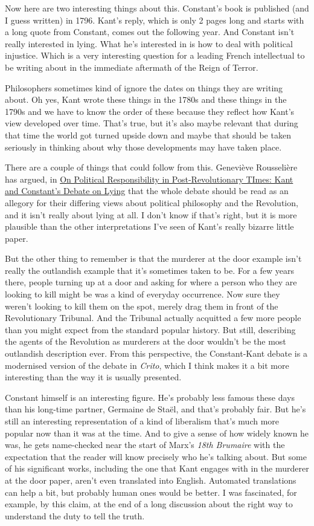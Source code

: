 \documentclass[
]{article}
\begin{document}
Now here are two interesting things about this. Constant's book is
published (and I guess written) in 1796. Kant's reply, which is only 2
pages long and starts with a long quote from Constant, comes out the
following year. And Constant isn't really interested in lying. What he's
interested in is how to deal with political injustice. Which is a very
interesting question for a leading French intellectual to be writing
about in the immediate aftermath of the Reign of Terror.

Philosophers sometimes kind of ignore the dates on things they are
writing about. Oh yes, Kant wrote these things in the 1780s and these
things in the 1790s and we have to know the order of these because they
reflect how Kant's view developed over time. That's true, but it's also
maybe relevant that during that time the world got turned upside down
and maybe that should be taken seriously in thinking about why those
developments may have taken place.

There are a couple of things that could follow from this. Geneviève
Rousselière has argued, in
\href{https://journals.sagepub.com/doi/abs/10.1177/1474885115588100?journalCode=epta}{On
Political Responsibility in Post-Revolutionary TImes: Kant and
Constant's Debate on Lying} that the whole debate should be read as an
allegory for their differing views about political philosophy and the
Revolution, and it isn't really about lying at all. I don't know if
that's right, but it is more plausible than the other interpretations
I've seen of Kant's really bizarre little paper.

But the other thing to remember is that the murderer at the door example
isn't really the outlandish example that it's sometimes taken to be. For
a few years there, people turning up at a door and asking for where a
person who they are looking to kill might be was a kind of everyday
occurrence. Now sure they weren't looking to kill them on the spot,
merely drag them in front of the Revolutionary Tribunal. And the
Tribunal actually acquitted a few more people than you might expect from
the standard popular history. But still, describing the agents of the
Revolution as murderers at the door wouldn't be the most outlandish
description ever. From this perspective, the Constant-Kant debate is a
modernised version of the debate in \emph{Crito}, which I think makes it
a bit more interesting than the way it is usually presented.

Constant himself is an interesting figure. He's probably less famous
these days than his long-time partner, Germaine de Staël, and that's
probably fair. But he's still an interesting representation of a kind of
liberalism that's much more popular now than it was at the time. And to
give a sense of how widely known he was, he gets name-checked near the
start of Marx's \emph{18th Brumaire} with the expectation that the
reader will know precisely who he's talking about. But some of his
significant works, including the one that Kant engages with in the
murderer at the door paper, aren't even translated into English.
Automated translations can help a bit, but probably human ones would be
better. I was fascinated, for example, by this claim, at the end of a
long discussion about the right way to understand the duty to tell the
truth.
\end{document}
